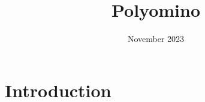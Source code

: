 \documentclass{article}
\title{\textbf{Polyomino}}
\date{November 2023}
\begin{document}
\maketitle

\section{Introduction}
\end{document}
